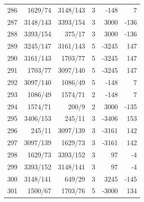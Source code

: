 \documentclass[11pt,a4paper]{article}
\begin{document}
\begin{minipage}[t]{.49\linewidth}
\begin{tabular*}{\linewidth}{@{}r@{\extracolsep{\fill}}rrrrr@{}}
286 & 1629/74 & 3148/143 & 3 & -148 & 7\\
287 & 3148/143 & 3393/154 & 3 & 3000 & -136\\
288 & 3393/154 & 375/17 & 3 & 3000 & -136\\
289 & 3245/147 & 3161/143 & 5 & -3245 & 147\\
290 & 3161/143 & 1703/77 & 5 & -3245 & 147\\
291 & 1703/77 & 3097/140 & 5 & -3245 & 147\\
292 & 3097/140 & 1086/49 & 5 & -148 & 7\\
293 & 1086/49 & 1574/71 & 2 & -148 & 7\\
294 & 1574/71 & 200/9 & 2 & 3000 & -135\\
295 & 3406/153 & 245/11 & 3 & -3406 & 153\\
296 & 245/11 & 3097/139 & 3 & -3161 & 142\\
297 & 3097/139 & 1629/73 & 3 & -3161 & 142\\
298 & 1629/73 & 3393/152 & 3 & 97 & -4\\
299 & 3393/152 & 3148/141 & 3 & 97 & -4\\
300 & 3148/141 & 649/29 & 3 & 3245 & -145\\
301 & 1500/67 & 1703/76 & 5 & -3000 & 134\\
\bottomrule\end{tabular*}\end{minipage}\hfill
\end{document}
